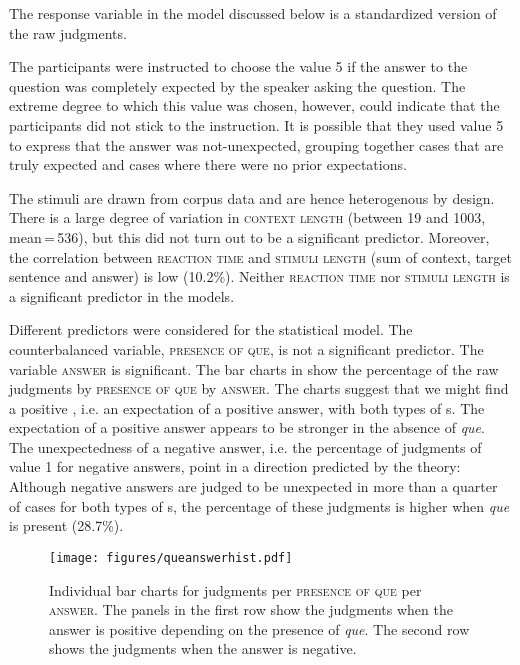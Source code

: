 The response variable in the model discussed below is a standardized version of the raw judgments.

The participants were instructed to choose the value   5 if the answer to the question was completely expected by the speaker asking the question. The extreme degree to which this value was chosen, however, could indicate that the participants did not stick to the instruction. It is possible that they used  value 5 to express that the answer was not-unexpected, grouping together cases that are truly expected and cases where there were no prior expectations. 

The stimuli are drawn from corpus data and are hence heterogenous by design. There is a large degree of variation in \textsc{context length} (between 19 and 1003, mean\,=\,536), but this did not turn out to be a significant predictor. Moreover, the correlation between \textsc{reaction time} and \textsc{stimuli length} (sum of context, target sentence and answer) is low (10.2\%). Neither \textsc{reaction time} nor \textsc{stimuli length} is a significant predictor in the models.

Different predictors were considered for the statistical model. 
The counterbalanced variable, \textsc{presence of que}, is not a significant predictor. The variable \textsc{answer} is significant. The bar charts in  show the percentage of the raw judgments by \textsc{presence of que} by  \textsc{answer}. The charts suggest that we might find a positive , i.e. an expectation of a positive answer, with both types of s. The expectation of a positive answer appears to be stronger in the absence of \emph{que}. The unexpectedness of a negative answer, i.e. the percentage of judgments of  value 1 for negative answers,  point in a direction predicted by the theory: Although negative answers are judged to be unexpected in more than a quarter of  cases for both types of s, the percentage of these judgments is higher when \emph{que} is present (28.7\%). 

\begin{figure}[p] 
	\caption{Individual bar charts for judgments per \textsc{presence of que} per \textsc{answer}. The panels in the first row show the judgments when the answer is positive depending on the presence of \emph{que}. The second row shows the judgments when the answer is negative.\label{fig:catqueans}}
	\texttt{[image: figures/queanswerhist.pdf]}
\end{figure}

